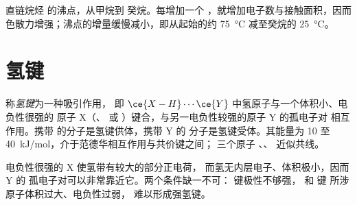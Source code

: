 \begin{omfigure}

{\small 直链烷烃  的沸点，从甲烷到
癸烷。每增加一个 ，就增加电子数与接触面积，因而
色散力增强；沸点的增量缓慢减小，即从起始的约
\qty{75}{\celsius} 减至癸烷的 \qty{25}{\celsius}。}
\end{omfigure}

\section{氢键}

\begin{definition}[氢键]\label{def:b1:intermolecular-forces-solvents:hbond}
称\emph{氢键}为一种吸引作用，
即 $\ce{X-H}\cdots\ce{Y}$ 中氢原子与一个体积小、电负性很强的
原子 X（、 或 ）键合，与另一电负性较强的原子 Y 的孤电子对
相互作用。携带  的分子是氢键供体，携带 Y 的
分子是氢键受体。其能量为 10
至 \qty{40}{kJ/mol}，介于范德华相互作用与共价键之间；
三个原子 、、 近似共线。
\end{definition}

\begin{remark}[为何选 N、O 和 F]\label{rem:b1:intermolecular-forces-solvents:why}
电负性很强的 X 使氢带有较大的部分正电荷，
而氢无内层电子、体积极小，因而 Y 的
孤电子对可以非常靠近它。两个条件缺一不可：
 键极性不够强， 和  键
所涉原子体积过大、电负性过弱，
难以形成强氢键。
\end{remark}

